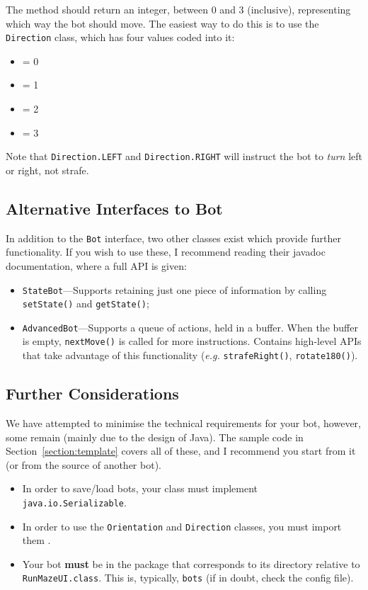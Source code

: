 \documentclass[11pt]{article}
\begin{document}
The method should return an integer, between 0 and 3 (inclusive), representing which way the bot should move.  The easiest way to do this is to use the \texttt{Direction} class, which has four values coded into it:
\begin{itemize}
\item {} = 0
\item {} = 1
\item {} = 2
\item {} = 3
\end{itemize}
Note that \texttt{Direction.LEFT} and \texttt{Direction.RIGHT} will instruct the bot to \textit{turn} left or right, not strafe.



\subsection{Alternative Interfaces to Bot}
\label{section:alternativeapis}
In addition to the \texttt{Bot} interface, two other classes exist which provide further functionality.  If you wish to use these, I recommend reading their javadoc documentation, where a full API is given:
\begin{itemize}
\item \texttt{StateBot}---Supports retaining just one piece of information by calling \texttt{setState()} and \texttt{getState()};
\item \texttt{AdvancedBot}---Supports a queue of actions, held in a buffer.  When the buffer is empty, \texttt{nextMove()} is called for more instructions.  Contains high-level APIs that take advantage of this functionality (\textsl{e.g.} \texttt{strafeRight()}, \texttt{rotate180()}).
\end{itemize}


\subsection{Further Considerations}
We have attempted to minimise the technical requirements for your bot, however, some remain (mainly due to the design of Java).  The sample code in Section~\ref{section:template} covers all of these, and I recommend you start from it (or from the source of another bot).

\begin{itemize}
\item In order to save/load bots, your class must implement \texttt{java.io.Serializable}.  
\item In order to use the \texttt{Orientation} and \texttt{Direction} classes, you must import them .
\item Your bot \textbf{must} be in the package that corresponds to its directory relative to \texttt{RunMazeUI.class}.  This is, typically, \texttt{bots} (if in doubt, check the config file).
\end{itemize}
\end{document}

